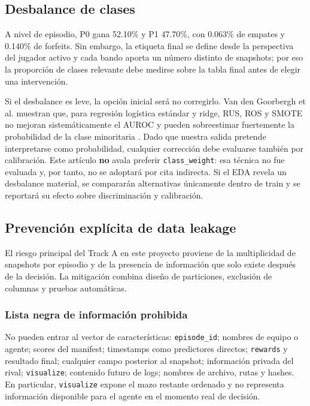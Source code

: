 \subsection{Desbalance de clases}
\label{subsec:desbalance}
A nivel de episodio, P0 gana 52.10\% y P1 47.70\%, con 0.063\% de
empates y 0.140\% de forfeits. Sin embargo, la etiqueta final se define
desde la perspectiva del jugador activo y cada bando aporta un número
distinto de snapshots; por eso la proporción de clases relevante debe
medirse sobre la tabla final antes de elegir una intervención.

Si el desbalance es leve, la opción inicial será no corregirlo. Van den
Goorbergh et al. muestran que, para regresión logística estándar y
ridge, RUS, ROS y SMOTE no mejoran sistemáticamente el AUROC y pueden
sobreestimar fuertemente la probabilidad de la clase minoritaria
\cite{vandenGoorbergh_imbalance_2022}. Dado que nuestra salida pretende
interpretarse como probabilidad, cualquier corrección debe evaluarse
también por calibración. Este artículo \textbf{no} avala preferir
\texttt{class\_weight}: esa técnica no fue evaluada y, por tanto, no se
adoptará por cita indirecta. Si el EDA revela un desbalance material,
se compararán alternativas únicamente dentro de train y se reportará
su efecto sobre discriminación y calibración.

\subsection{Prevención explícita de data leakage}
\label{subsec:leakage}
El riesgo principal del Track A en este proyecto proviene de la
multiplicidad de snapshots por episodio y de la presencia de información
que solo existe después de la decisión. La mitigación combina diseño de
particiones, exclusión de columnas y pruebas automáticas.

\subsubsection{Lista negra de información prohibida}
No pueden entrar al vector de características: \texttt{episode\_id};
nombres de equipo o agente; scores del manifest; timestamps como
predictores directos; \texttt{rewards} y resultado final; cualquier
campo posterior al snapshot; información privada del rival;
\texttt{visualize}; contenido futuro de logs; nombres de archivo, rutas
y hashes. En particular, \texttt{visualize} expone el mazo restante
ordenado y no representa información disponible para el agente en el
momento real de decisión.

